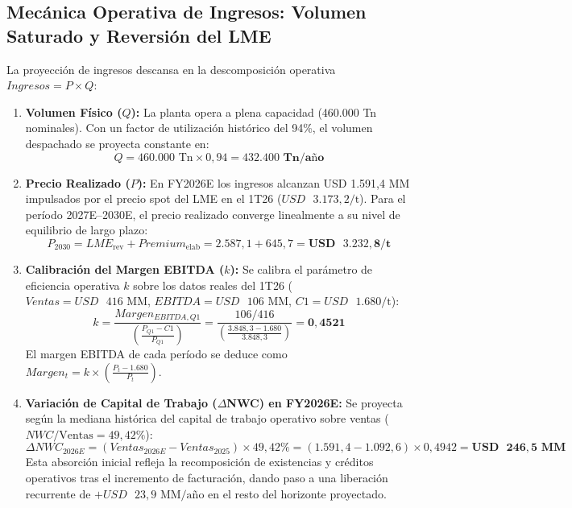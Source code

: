 \documentclass[10pt,a4paper]{article}
\begin{document}
\subsection{Mecánica Operativa de Ingresos: Volumen Saturado y Reversión del LME}
La proyección de ingresos descansa en la descomposición operativa $Ingresos = P \times Q$:
\begin{enumerate}
    \item \textbf{Volumen Físico ($Q$):} La planta opera a plena capacidad (460.000 Tn nominales). Con un factor de utilización histórico del 94\%, el volumen despachado se proyecta constante en:
    \begin{equation}
        Q = 460.000\text{ Tn} \times 0,94 = \mathbf{432.400\text{ Tn/año}}
    \end{equation}
    \item \textbf{Precio Realizado ($P$):} En FY2026E los ingresos alcanzan USD 1.591,4 MM impulsados por el precio spot del LME en el 1T26 ($USD\text{ }3.173,2/\text{t}$). Para el período 2027E--2030E, el precio realizado converge linealmente a su nivel de equilibrio de largo plazo:
    \begin{equation}
        P_{2030} = LME_{\text{rev}} + Premium_{\text{elab}} = 2.587,1 + 645,7 = \mathbf{USD\text{ }3.232,8/\text{t}}
    \end{equation}
    \item \textbf{Calibración del Margen EBITDA ($k$):} Se calibra el parámetro de eficiencia operativa $k$ sobre los datos reales del 1T26 ($Ventas = USD\text{ }416\text{ MM}$, $EBITDA = USD\text{ }106\text{ MM}$, $C1 = USD\text{ }1.680/\text{t}$):
    \begin{equation}
        k = \frac{Margen_{EBITDA, Q1}}{\left(\frac{P_{Q1} - C1}{P_{Q1}}\right)} = \frac{106 / 416}{\left(\frac{3.848,3 - 1.680}{3.848,3}\right)} = \mathbf{0,4521}
    \end{equation}
    El margen EBITDA de cada período se deduce como $Margen_t = k \times \left(\frac{P_t - 1.680}{P_t}\right)$.
    \item \textbf{Variación de Capital de Trabajo ($\Delta$NWC) en FY2026E:} Se proyecta según la mediana histórica del capital de trabajo operativo sobre ventas ($NWC/\text{Ventas} = 49,42\%$):
    \begin{equation}
        \Delta NWC_{2026E} = (Ventas_{2026E} - Ventas_{2025}) \times 49,42\% = (1.591,4 - 1.092,6) \times 0,4942 = \mathbf{USD\text{ }246,5\text{ MM}}
    \end{equation}
    Esta absorción inicial refleja la recomposición de existencias y créditos operativos tras el incremento de facturación, dando paso a una liberación recurrente de $+USD\text{ }23,9\text{ MM/año}$ en el resto del horizonte proyectado.
\end{enumerate}
\end{document}
